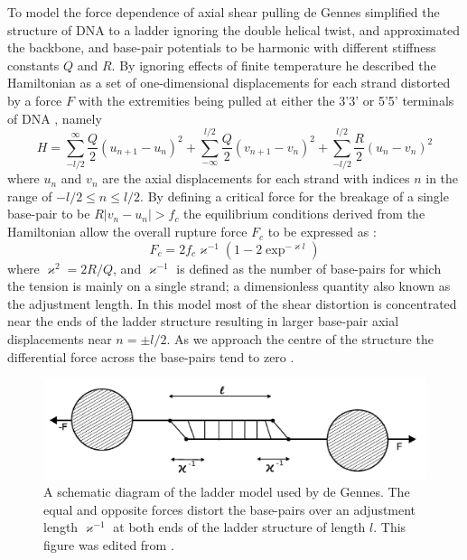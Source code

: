 To model the force dependence of axial shear pulling de Gennes simplified the structure of DNA to a ladder ignoring the double helical twist, and approximated the backbone, and base-pair potentials to be harmonic with different stiffness constants $Q$ and $R$. By ignoring effects of finite temperature he described the Hamiltonian as a set of one-dimensional displacements for each strand distorted by a force $F$ with the extremities being pulled at either the 3'3' or 5'5' terminals of DNA \cite{DeGennes2001,Hatch2008}, namely
%
\begin{equation}
\label{deGennes_ham}
H=\sum_{-l/2}^{\infty}\frac{Q}{2}\left(u_{n+1}-u_{n}\right)^{2}+\sum_{-\infty}^{l/2}\frac{Q}{2}\left(v_{n+1}-v_{n}\right)^{2}+\sum_{-l/2}^{l/2}\frac{R}{2}\left(u_{n}-v_{n}\right)^{2}
\end{equation}
%
where $u_{n}$ and $v_{n}$ are the axial displacements for each strand with indices $n$ in the range of $-l/2 \leq n \leq l/2$. By defining a critical force for the breakage of a single base-pair to be $R|v_{n}-u_{n}|>f_{c}$ the equilibrium conditions derived from the Hamiltonian allow the overall rupture force $F_{c}$ to be expressed as \cite{DeGennes2001}:
%
%
\begin{equation}
\label{deGennes_eq}
F_{c}=2 f_{c}\varkappa^{-1}\left(1-2\exp^{-\varkappa l}\right)
\end{equation}
%
%
where $\varkappa^{2}=2R/Q$, and $\varkappa^{-1}$ is defined as the number of base-pairs for which the tension is mainly on a single strand; a dimensionless quantity also known as the adjustment length. In this model most of the shear distortion is concentrated near the ends of the ladder structure resulting in larger base-pair axial displacements near $n=\pm l/2$. As we approach the centre of the structure the differential force across the base-pairs tend to zero \cite{DeGennes2001}.
%
\begin{figure}[t]
\centering
\includegraphics[scale=0.6]{Graphics/DNA/fig1_DeGennes2001.pdf}
\caption{A schematic diagram of the ladder model used by de Gennes. The equal and opposite forces distort the base-pairs over an adjustment length $\varkappa^{-1}$ at both ends of the ladder structure of length $l$. This figure was edited from \cite{DeGennes2001}.}
\label{fig:fig1_DeGennes2001}
\end{figure}
